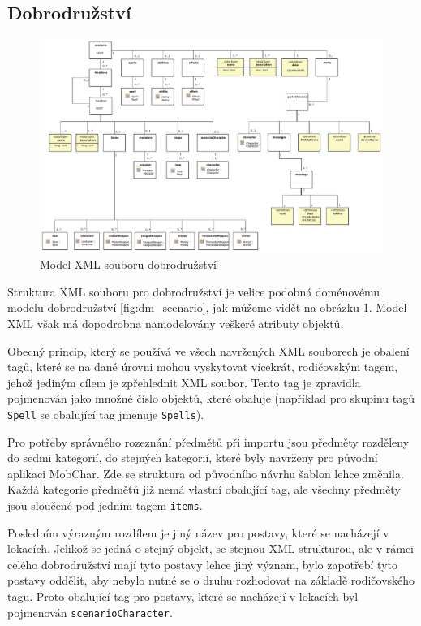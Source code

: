 \documentclass[thesis=B,czech]{resources/FITthesis}[2012/06/26]
\begin{document}
\subsection{Dobrodružství}
\begin{figure}\centering
	\includegraphics[width=1\textwidth]{images/scenarioXML}
	\caption[Model XML souboru dobrodružství]{Model XML souboru dobrodružství}\label{fig:xml_scenario}
\end{figure}
Struktura XML souboru pro dobrodružství je velice podobná doménovému modelu dobrodružství \ref{fig:dm_scenario}, jak můžeme vidět na obrázku \ref{fig:xml_scenario}. Model XML však má dopodrobna namodelovány veškeré atributy objektů. \par

Obecný princip, který se používá ve všech navržených XML souborech je obalení tagů, které se na dané úrovni mohou vyskytovat vícekrát, rodičovským tagem, jehož jediným cílem je zpřehlednit XML soubor. Tento tag je zpravidla pojmenován jako množné číslo objektů, které obaluje (například pro skupinu tagů \texttt{Spell} se obalující tag jmenuje \texttt{Spells}).

Pro potřeby správného rozeznání předmětů při importu jsou předměty rozděleny do sedmi kategorií, do stejných kategorií, které byly navrženy pro původní aplikaci MobChar. Zde se struktura od původního návrhu šablon lehce změnila. Každá kategorie předmětů již nemá vlastní obalující tag, ale všechny předměty jsou sloučené pod jedním tagem \texttt{items}. \par

Posledním výrazným rozdílem je jiný název pro postavy, které se nacházejí v lokacích. Jelikož se jedná o stejný objekt, se stejnou XML strukturou, ale v rámci celého dobrodružství mají tyto postavy lehce jiný význam, bylo zapotřebí tyto postavy oddělit, aby nebylo nutné se o druhu rozhodovat na základě rodičovského tagu. Proto obalující tag pro postavy, které se nacházejí v lokacích byl pojmenován \texttt{scenarioCharacter}. 
\end{document}
